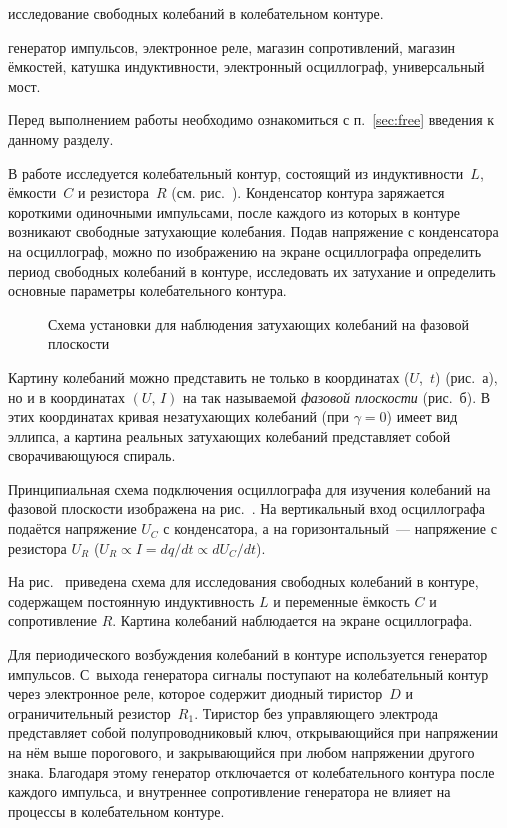 
\begin{lab:aim}
исследование свободных колебаний в колебательном контуре.
\end{lab:aim}

\begin{lab:equipment}
генератор импульсов, электронное реле, магазин сопротивлений, магазин ёмкостей,
катушка индуктивности, электронный осциллограф, универсальный мост.
\end{lab:equipment}

Перед выполнением работы необходимо ознакомиться с п.~\ref{sec:free}
введения к данному разделу.

В работе исследуется колебательный контур, состоящий из индуктивности~$L$, 
ёмкости~$C$ и резистора~$R$ (см. рис.~). Конденсатор 
контура заряжается короткими одиночными импульсами, после каждого из которых 
в контуре возникают свободные затухающие колебания. Подав напряжение 
с конденсатора на осциллограф, можно по изображению на экране осциллографа 
определить период свободных колебаний в контуре, исследовать их затухание и 
определить основные параметры колебательного контура.

\begin{wrapfigure}[15]{r}{0.45\linewidth}
	\caption{Схема установки для наблюдения затухающих колебаний на фазовой
плоскости}
\end{wrapfigure}
Картину колебаний можно представить не только в координатах ($U$,~$t$)
(рис.~а), но и в координатах $(U,\,I)$ на так называемой 
\emph{фазовой плоскости} (рис.~б). В этих координатах кривая
незатухающих колебаний (при $\gamma=0$) имеет вид эллипса, а картина реальных
затухающих колебаний представляет собой сворачивающуюся спираль.

Принципиальная схема подключения осциллографа для изучения колебаний на фазовой
плоскости изображена на рис.~. На вертикальный вход
осциллографа подаётся напряжение $U_C$ с конденсатора, а на
горизонтальный~--- напряжение с резистора $U_R$ 
($U_R \propto I = dq/dt \propto dU_C/dt$).

\experiment 
На рис.~ приведена схема для исследования
свободных колебаний в контуре, содержащем постоянную индуктивность $L$ и
переменные ёмкость $C$ и сопротивление $R$. Картина колебаний наблюдается на
экране осциллографа.


Для периодического возбуждения колебаний в контуре используется генератор
импульсов. С~выхода генератора сигналы поступают на колебательный контур через
электронное реле, которое содержит диодный тиристор~$D$ и ограничительный
резистор~$R_1$. Тиристор без управляющего электрода представляет собой
полупроводниковый ключ, открывающийся при напряжении на нём выше порогового, и
закрывающийся при любом напряжении другого знака. Благодаря этому генератор
отключается от колебательного контура после каждого импульса, и внутреннее
сопротивление генератора не влияет на процессы в колебательном контуре.

